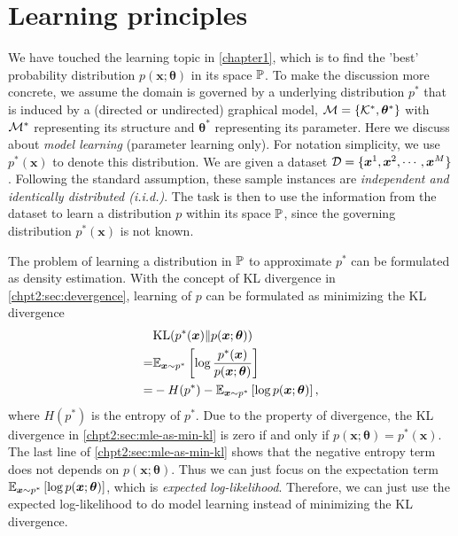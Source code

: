 \section{Learning principles}
We have touched the learning topic in \autoref{chapter1}, which is to find the 'best' probability distribution $p(\bm{x}; \bm{\theta})$ in its space $\mathbb{P}$. To make the discussion more concrete, we assume the domain is governed by a underlying distribution $p^{\ast}$ that is induced by a (directed or undirected) graphical model, $\mathcal{M} = \left\{ \mathcal{K}^{\ast}, \bm{\theta}^{\ast} \right\}$ with $\mathcal{M}^{\ast}$ representing its structure and $\bm{\theta}^{\ast}$ representing its parameter. Here we discuss about \textit{model learning} (parameter learning only). For notation simplicity, we use $p^{\ast}(\bm{x})$ to denote this distribution. We are given a dataset $\mathcal{D} = \{\bm{x}^{1}, \bm{x}^{2}, \cdots, \bm{x}^{M}\}$. Following the standard assumption, these sample instances are \textit{independent and identically distributed (i.i.d.)}. The task is then to use the information from the dataset to learn a distribution $p$ within its space $\mathbb{P}$, since the governing distribution $p^{\ast}(\bm{x})$ is not known.

The problem of learning a distribution in $\mathbb{P}$ to approximate $p^{\ast}$ can be formulated as density estimation. With the concept of KL divergence in \autoref{chpt2:sec:devergence}, learning of $p$ can be formulated as minimizing the KL divergence
\begin{align}\label{chpt2:sec:mle-as-min-kl}
  &\mathrm{KL}(p^{\ast}(\bm{x})\|p(\bm{x}; \bm{\theta})) \nonumber \\
  =& \mathbb{E}_{\bm{x} \sim p^{\ast}}\left[ \log{\frac{p^{\ast}(\bm{x})}{p(\bm{x}; \bm{\theta})}} \right] \nonumber \\
  =& - H(p^{\ast}) - \mathbb{E}_{\bm{x} \sim p^{\ast}}\left[ \log{{p(\bm{x}; \bm{\theta})}} \right],
\end{align}
where $H(p^{\ast})$ is the entropy of $p^{\ast}$.
Due to the property of divergence, the KL divergence in \ref{chpt2:sec:mle-as-min-kl} is zero if and only if $p(\bm{x};\bm{\theta})=p^{\ast}(\bm{x})$. The last line of \ref{chpt2:sec:mle-as-min-kl} shows that the negative entropy term does not depends on $p(\bm{x}; \bm{\theta})$. Thus we can just focus on the expectation term $\mathbb{E}_{\bm{x} \sim p^{\ast}}\left[ \log{{p(\bm{x}; \bm{\theta})}} \right]$, which is \textit{expected log-likelihood}. Therefore, we can just use the expected log-likelihood to do model learning instead of minimizing the KL divergence.

